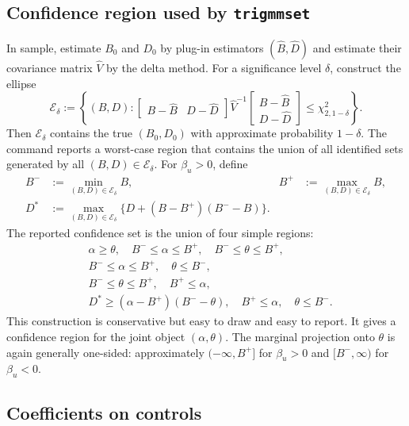 \documentclass[11pt]{article}
\newcommand{\cE}{\mathcal{E}}
\theoremstyle{plain}
\theoremstyle{definition}
\theoremstyle{remark}
\begin{document}
\subsection{Confidence region used by \texttt{trigmmset}}

In sample, estimate $B_0$ and $D_0$ by plug-in estimators $(\widehat B,\widehat D)$
and estimate their covariance matrix $\widehat V$ by the delta method. For a
significance level $\delta$, construct the ellipse
\begin{equation}
\cE_\delta:=
\left\{(B,D):
\begin{bmatrix}B-\widehat B & D-\widehat D\end{bmatrix}
\widehat V^{-1}
\begin{bmatrix}B-\widehat B\\ D-\widehat D\end{bmatrix}
\le \chi^2_{2,1-\delta}
\right\}.
\label{eq:ellipse}
\end{equation}
Then $\cE_\delta$ contains the true $(B_0,D_0)$ with approximate probability
$1-\delta$. The command reports a worst-case region that contains the union of
all identified sets generated by all $(B,D)\in\cE_\delta$. For $\beta_u>0$, define
\begin{align}
B^-&:=\min_{(B,D)\in\cE_\delta}B,
&
B^+&:=\max_{(B,D)\in\cE_\delta}B,
\label{eq:Bminusplus}\\
D^*&:=\max_{(B,D)\in\cE_\delta}
\{D+(B-B^+)(B^- -B)\}.
\label{eq:Dstar}
\end{align}
The reported confidence set is the union of four simple regions:
\begin{align}
&\alpha\ge\theta,\quad B^-\le\alpha\le B^+,
\quad B^-\le\theta\le B^+,\label{eq:region1}\\
&B^-\le\alpha\le B^+,
\quad \theta\le B^-,\label{eq:region2}\\
&B^-\le\theta\le B^+,
\quad B^+\le\alpha,\label{eq:region3}\\
&D^*\ge(\alpha-B^+)(B^- -\theta),
\quad B^+\le\alpha,
\quad \theta\le B^-.
\label{eq:region4}
\end{align}
This construction is conservative but easy to draw and easy to report. It gives a
confidence region for the joint object $(\alpha,\theta)$. The marginal projection
onto $\theta$ is again generally one-sided: approximately $(-\infty,B^+]$ for
$\beta_u>0$ and $[B^-,\infty)$ for $\beta_u<0$.

\subsection{Coefficients on controls}
\end{document}
